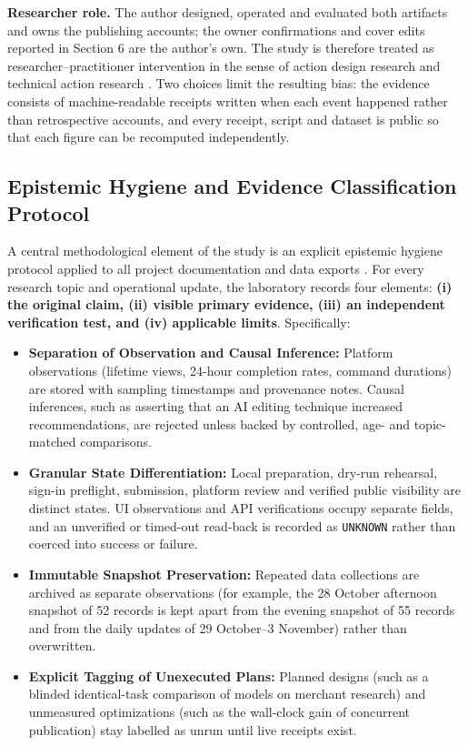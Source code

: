 \documentclass[11pt,a4paper]{article}
\theoremstyle{definition}
\begin{document}
\textbf{Researcher role.} The author designed, operated and evaluated both artifacts and owns the publishing accounts; the owner confirmations and cover edits reported in Section 6 are the author's own. The study is therefore treated as researcher--practitioner intervention in the sense of action design research \citep{Sein2011} and technical action research \citep{Wieringa2014}. Two choices limit the resulting bias: the evidence consists of machine-readable receipts written when each event happened rather than retrospective accounts, and every receipt, script and dataset is public so that each figure can be recomputed independently.

\subsection{Epistemic Hygiene and Evidence Classification Protocol}
\label{sec:3.2}

A central methodological element of the study is an explicit epistemic hygiene protocol applied to all project documentation and data exports \citep{Runeson2009}. For every research topic and operational update, the laboratory records four elements: \textbf{(i) the original claim, (ii) visible primary evidence, (iii) an independent verification test, and (iv) applicable limits}. Specifically:

\begin{itemize}[leftmargin=1.8em]
    \item \textbf{Separation of Observation and Causal Inference:} Platform observations (lifetime views, 24-hour completion rates, command durations) are stored with sampling timestamps and provenance notes. Causal inferences, such as asserting that an AI editing technique increased recommendations, are rejected unless backed by controlled, age- and topic-matched comparisons.
    \item \textbf{Granular State Differentiation:} Local preparation, dry-run rehearsal, sign-in preflight, submission, platform review and verified public visibility are distinct states. UI observations and API verifications occupy separate fields, and an unverified or timed-out read-back is recorded as \texttt{UNKNOWN} rather than coerced into success or failure.
    \item \textbf{Immutable Snapshot Preservation:} Repeated data collections are archived as separate observations (for example, the 28 October afternoon snapshot of 52 records is kept apart from the evening snapshot of 55 records and from the daily updates of 29 October--3 November) rather than overwritten.
    \item \textbf{Explicit Tagging of Unexecuted Plans:} Planned designs (such as a blinded identical-task comparison of models on merchant research) and unmeasured optimizations (such as the wall-clock gain of concurrent publication) stay labelled as unrun until live receipts exist.
\end{itemize}
\end{document}
